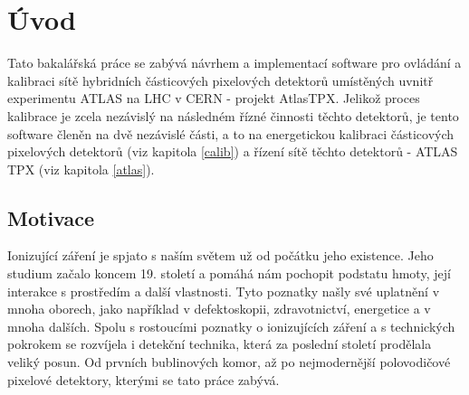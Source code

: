 

\chapter{Úvod}\label{chap01}
Tato bakalářská práce se zabývá návrhem a implementací software pro ovládání a kalibraci sítě hybridních částicových pixelových detektorů umístěných uvnitř experimentu ATLAS na LHC v CERN - projekt AtlasTPX. 
Jelikož proces kalibrace je zcela nezávislý na následném řízné činnosti těchto detektorů, je tento software členěn na dvě nezávislé části, a to na energetickou kalibraci částicových pixelových detektorů (viz kapitola \ref{calib}) a řízení sítě těchto detektorů - ATLAS TPX (viz kapitola \ref{atlas}).

\todo

\section{Motivace}
Ionizující záření je spjato s naším světem už od počátku jeho existence. Jeho studium začalo koncem 19. století a pomáhá nám pochopit podstatu hmoty, její interakce s prostředím a další vlastnosti. Tyto poznatky našly své uplatnění v mnoha oborech, jako například v defektoskopii, zdravotnictví, energetice a v mnoha dalších. Spolu s rostoucími poznatky o ionizujících záření a s technických pokrokem se rozvíjela i detekční technika, která za poslední století prodělala veliký posun. Od prvních bublinových komor, až po nejmodernější polovodičové pixelové detektory, kterými se tato práce zabývá. 


	